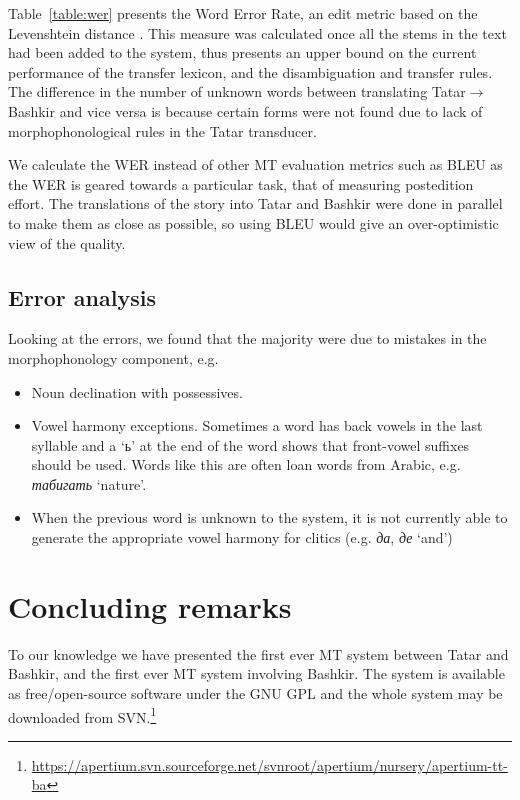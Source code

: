 \documentclass[11pt,a4paper]{article}
\begin{document}
Table~\ref{table:wer} presents the Word Error Rate, an edit metric based on the Levenshtein 
distance \cite{levenshtein/1966}. This measure was calculated once all the stems in the 
text had been added to the system, thus presents an upper bound on the current performance
of the transfer lexicon, and the disambiguation and transfer rules. The difference in 
the number of unknown words between translating Tatar$\rightarrow$Bashkir and vice versa
is because certain forms were not found due to lack of morphophonological rules in the
Tatar transducer.

We calculate the WER instead of other MT evaluation metrics such as BLEU as the WER is 
geared towards a particular task, that of measuring postedition effort. The translations 
of the story into Tatar and Bashkir were done in parallel to make them as close as possible,
so using BLEU would give an over-optimistic view of the quality.

\subsection{Error analysis}

Looking at the errors, we found that the majority were due to mistakes in
the morphophonology component, e.g.
\begin{itemize}
  \item Noun declination with possessives. 
  \item Vowel harmony exceptions. Sometimes a word has back vowels in the last syllable and a `ь' at the end 
    of the word shows that front-vowel suffixes should be used. Words like this are often loan words 
    from Arabic, e.g. \emph{табигать} `nature'.
  \item When the previous word is unknown to the system,
    it is not currently able to generate the appropriate vowel harmony for clitics (e.g. \emph{да}, \emph{де} `and')
\end{itemize}




\section{Concluding remarks}
\label{sec:conc}

To our knowledge we have presented the first ever MT system between Tatar and Bashkir, and the first ever MT system involving Bashkir. The system is available as free/open-source software under the GNU GPL and the 
whole system may be downloaded from SVN.\footnote{\url{https://apertium.svn.sourceforge.net/svnroot/apertium/nursery/apertium-tt-ba}}
\end{document}
